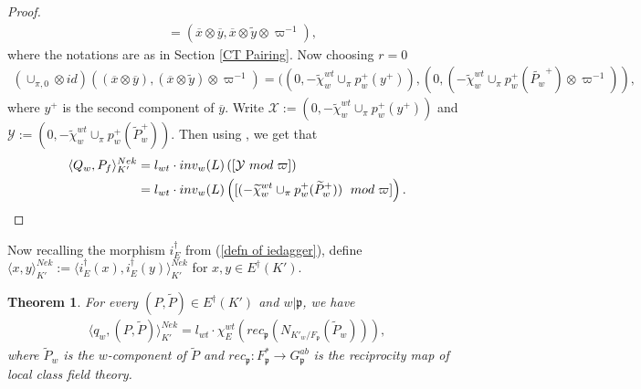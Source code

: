\documentclass[reqno,10pt]{amsart}
\newcommand{\p}{\mathfrak{p}}
\newcommand{\vp}{\varpi}
\newcommand{\ox}{\overline{x}}
\newcommand{\oy}{\overline{y}}
\newcommand{\wy}{\widetilde{y}}
\newcommand{\tp}{\widetilde{P}}
\theoremstyle{plain}
\newtheorem{thm}{Theorem}[section]
\theoremstyle{definition}
\begin{document}
\begin{proof}
\begin{align*}
        & = (\ox \otimes \oy, \ox \otimes \wy \otimes \vp^{-1}),
    \end{align*}
    where the notations are as in Section \ref{CT Pairing}.
    Now choosing $r=0$
     \begin{align*}
         (\cup_{\pi,0} \otimes id)((\ox \otimes \oy), (\ox \otimes \wy) \otimes \vp^{-1}) = ((0,-\widetilde{\chi}_w^{wt} \cup_\pi p_w^+(y^+)), (0,(-\widetilde{\chi}_w^{wt} \cup_\pi p_w^+(\widetilde{P_w}^+) \otimes \vp^{-1})),
     \end{align*}
     where $y^+$ is the second component of $\oy$.
     Write $\mathcal{X} := (0,-\widetilde{\chi}_w^{wt} \cup_\pi p_w^+(y^+))$ and $\mathcal{Y} := (0,-\widetilde{\chi}_w^{wt} \cup_\pi p_w^+(\tp_w^+))$. Then using \cite[Lemma 4.9]{venerucci2013p}, we get that
     \begin{align*}
         \langle Q_w,P_f \rangle^{Nek}_{K'} & = l_{wt} \cdot inv_w(L)\left([\mathcal{Y}\  mod \hspace{1mm} \vp] \right) \\
         & = l_{wt} \cdot inv_w(L)\left([(-\widetilde{\chi}_w^{wt} \cup_\pi p_w^+(\widetilde{P}_w^+)) \hspace{1mm}  \ mod \hspace{1mm} \vp] \right).
     \end{align*}
\end{proof}

Now recalling the morphism $i_E^\dagger$ from (\ref{defn of iedagger}), define $\langle x,y \rangle^{Nek}_{K'} := \langle i_E^\dagger(x),i_E^\dagger(y) \rangle^{Nek}_{K'}$ for $x,y \in E^\dagger(K')$.

\begin{thm} \label{PairingInTermsOfReciprocityMap}
    For every $(P,\widetilde{P}) \in E^\dagger(K')$ and $w|\p$, we have
    \begin{align*}
        \langle q_w,(P,\widetilde{P}) \rangle^{Nek}_{K'} = l_{wt} \cdot \chi_E^{wt}(rec_\p(N_{K'_w/F_\p}(\widetilde{P}_w))),
    \end{align*}
    where $\widetilde{P}_w$ is the $w$-component of $\widetilde{P}$ and $rec_\p : F_\p^* \rightarrow G_\p^{ab}$ is the reciprocity map of local class field theory.
\end{thm}
\end{document}
